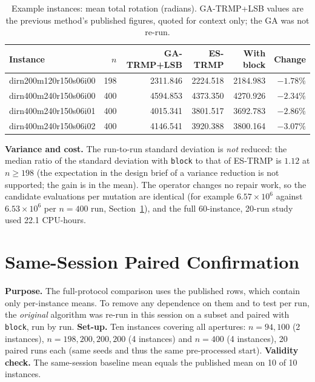 \begin{table}[htbp]
\centering
\caption{Example instances: mean total rotation (radians). GA-TRMP+LSB values are the previous method's published figures, quoted for context only; the GA was not re-run.}
\label{tab:examples}
\small
\begin{tabular}{lrrrrr}
\toprule
\textbf{Instance} & $n$ & \textbf{GA-TRMP+LSB} & \textbf{ES-TRMP} & \textbf{With block} & \textbf{Change}\\
\midrule
dirn200m120r150s06i00 & 198 & 2311.846 & 2224.518 & 2184.983 & $-1.78\%$\\
dirn400m240r150s06i00 & 400 & 4594.853 & 4373.350 & 4270.926 & $-2.34\%$\\
dirn400m240r150s06i01 & 400 & 4015.341 & 3801.517 & 3692.783 & $-2.86\%$\\
dirn400m240r150s06i02 & 400 & 4146.541 & 3920.388 & 3800.164 & $-3.07\%$\\
\bottomrule
\end{tabular}
\end{table}

\textbf{Variance and cost.} The run-to-run standard deviation is \emph{not} reduced: the median ratio of the standard deviation with \texttt{block} to that of ES-TRMP is $1.12$ at $n\ge198$ (the expectation in the design brief of a variance reduction is not supported; the gain is in the mean). The operator changes no repair work, so the candidate evaluations per mutation are identical (for example $6.57\times10^6$ against $6.53\times10^6$ per $n=400$ run, Section~\ref{sec:exp-paired}), and the full 60-instance, 20-run study used 22.1 CPU-hours.


\section{Same-Session Paired Confirmation}\label{sec:exp-paired}

\textbf{Purpose.} The full-protocol comparison uses the published rows, which contain only per-instance means. To remove any dependence on them and to test per run, the \emph{original} algorithm was re-run in this session on a subset and paired with \texttt{block}, run by run. \textbf{Set-up.} Ten instances covering all apertures: $n=94,100$ (2 instances), $n=198,200,200,200$ (4 instances) and $n=400$ (4 instances), 20 paired runs each (same seeds and thus the same pre-processed start). \textbf{Validity check.} The same-session baseline mean equals the published mean on 10 of 10 instances.

